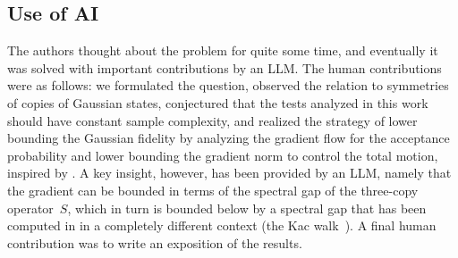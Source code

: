 \documentclass[11pt,a4paper]{article}
\numberwithin{equation}{section}
\newcommand{\1}{\mathbf{1}}
\begin{document}
\subsection*{Use of AI}
The authors thought about the problem for quite some time, and eventually it was solved with important contributions by an LLM.
The human contributions were as follows:
we formulated the question, observed the relation to symmetries of copies of Gaussian states, conjectured that the tests analyzed in this work should have constant sample complexity, and realized the strategy of lower bounding the Gaussian fidelity by analyzing the gradient flow for the acceptance probability and lower bounding the gradient norm to control the total motion, inspired by \cite{kwok2018paulsen,gradflow}.
A key insight, however, has been provided by an LLM, namely that the gradient can be bounded in terms of the spectral gap of the three-copy operator~$S$, which in turn is bounded below by a spectral gap that has been computed in \cite{carlen2000many,diaconis2000bounds,maslen2003eigenvalues,carlen2003determination,caputo2008spectral} in a completely different context (the Kac walk~\cite{kac1956foundations}).
A final human contribution was to write an exposition of the results.



\end{document}
